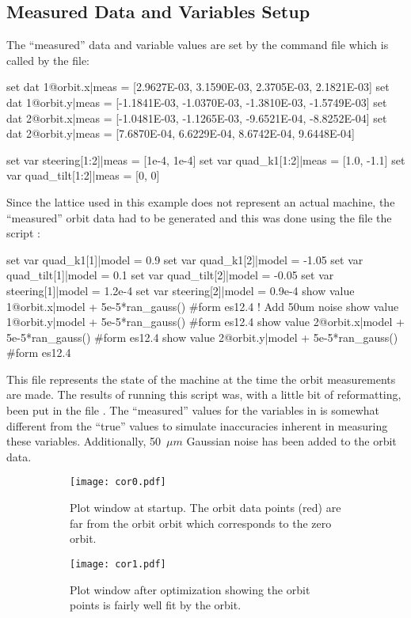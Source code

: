 \documentclass{hitec}     %
\begin{document}
{%
\subsection{Measured Data and Variables Setup}
\label{s:twiss.start}

The ``measured'' data and variable values are set by the command file  which is
called by the  file:
\begin{code}
set dat 1@orbit.x|meas = [2.9627E-03, 3.1590E-03, 2.3705E-03, 2.1821E-03]
set dat 1@orbit.y|meas = [-1.1841E-03, -1.0370E-03, -1.3810E-03, -1.5749E-03]
set dat 2@orbit.x|meas = [-1.0481E-03, -1.1265E-03, -9.6521E-04, -8.8252E-04]
set dat 2@orbit.y|meas = [7.6870E-04, 6.6229E-04, 8.6742E-04, 9.6448E-04]

set var steering[1:2]|meas = [1e-4, 1e-4]
set var quad_k1[1:2]|meas = [1.0, -1.1]
set var quad_tilt[1:2]|meas = [0, 0]
\end{code}


Since the lattice used in this example does not represent an actual machine, the ``measured'' orbit
data had to be generated and this was done using the file the script :
\begin{code}
set var quad_k1[1]|model = 0.9
set var quad_k1[2]|model = -1.05
set var quad_tilt[1]|model = 0.1    
set var quad_tilt[2]|model = -0.05
set var steering[1]|model = 1.2e-4  
set var steering[2]|model = 0.9e-4
show value 1@orbit.x|model + 5e-5*ran_gauss() #form es12.4  ! Add 50um noise
show value 1@orbit.y|model + 5e-5*ran_gauss() #form es12.4
show value 2@orbit.x|model + 5e-5*ran_gauss() #form es12.4
show value 2@orbit.y|model + 5e-5*ran_gauss() #form es12.4
\end{code}
This file represents the state of the machine at the time the orbit measurements are made.  The
results of running this script was, with a little bit of reformatting, been put in the file
. The ``measured'' values for the variables in  is somewhat
different from the ``true'' values  to simulate inaccuracies inherent in
measuring these variables. Additionally, 50~$\mu m$ Gaussian noise has been added to the orbit
data.


\begin{figure}[t]
  \centering
  \begin{subfigure}[t]{0.49\textwidth}
    \texttt{[image: cor0.pdf]}
    \caption{Plot window at startup. The  orbit data points (red) 
are far from the  orbit orbit which corresponds to the zero orbit.}
    \label{f:cor0}
  \end{subfigure}
  \hfil
  \begin{subfigure}[t]{0.49\textwidth}
    \texttt{[image: cor1.pdf]}
    \caption{Plot window after optimization showing the  orbit points is fairly 
well fit by the  orbit.}
    \label{f:cor1}
  \end{subfigure}
  \caption{}
\end{figure}

}
\end{document}
